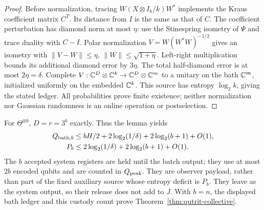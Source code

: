 \begin{proof}
Before normalization, tracing $W(X\otimes I_k/k)W^*$ implements
the Kraus coefficient matrix $C^T$. Its distance from $I$ is the
same as that of $C$. The coefficient perturbation has
diamond norm at most $\eta$: use the Stinespring isometry of $\Psi$
and trace duality with $C-I$. Polar normalization
$V=W(W^*W)^{-1/2}$ gives an isometry with
$\|V-W\|\leq\eta$, $\|W\|\leq\sqrt{1+\eta}$.
Left-right multiplication bounds its additional diamond error by
$3\eta$. The total half-diamond error is at most $2\eta=\delta$.
Complete $V:\mathbb C^D\otimes\mathbb C^k\to\mathbb C^D\otimes\mathbb C^m$ to a unitary
on the bath $\mathbb C^m$, initialized uniformly on the embedded $\mathbb C^k$.
This source has entropy $\log_2k$, giving the stated ledger.
All probabilities prove finite existence; neither normalization nor
Gaussian randomness is an online operation or postselection.
\end{proof}

For $\Theta^{\otimes b}$, $D=r=3^b$ exactly. Thus the lemma yields
\begin{equation}\label{eq:qutrit-collective-ledger}
\begin{aligned}
 Q_{{\rm bath},b}&\leq bH/2+2\log_2(1/\delta)+2\log_2(b+1)+O(1),\\
 P_b&\leq2\log_2(1/\delta)+2\log_2(b+1)+O(1).
\end{aligned}
\end{equation}
The $b$ accepted system registers are held until the batch output;
they use at most $2b$ encoded qubits and are
counted in $Q_{\rm peak}$. They are observer payload, rather than
part of the fixed auxiliary source whose entropy deficit is $P_b$.
They leave as the system output, so their release does not add to
$J$. With $b=n$, the displayed bath ledger and this custody count
prove Theorem~\ref{thm:qutrit-collective}.

